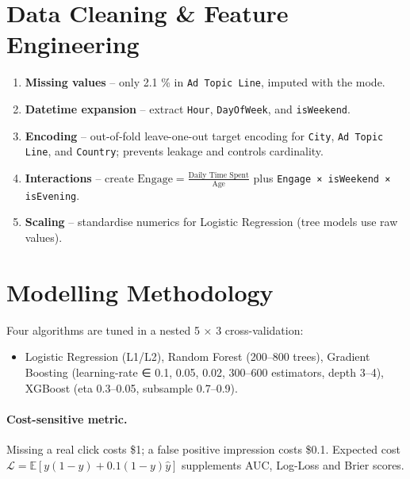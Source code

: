 \documentclass[12pt,a4paper]{article}
\begin{document}
\section{Data Cleaning \& Feature Engineering}\label{sec:fe}

\begin{enumerate}[leftmargin=2em]
  \item \textbf{Missing values} – only 2.1 \% in \texttt{Ad Topic Line},
        imputed with the mode.
  \item \textbf{Datetime expansion} – extract \texttt{Hour},
        \texttt{DayOfWeek}, and \texttt{isWeekend}.
  \item \textbf{Encoding} – out-of-fold leave-one-out target encoding
        for \texttt{City}, \texttt{Ad Topic Line}, and \texttt{Country};
        prevents leakage and controls cardinality.
  \item \textbf{Interactions} – create
        \(\text{Engage}= \frac{\text{Daily Time Spent}}{\text{Age}}\)
        plus \texttt{Engage × isWeekend × isEvening}.
  \item \textbf{Scaling} – standardise numerics for Logistic Regression
        (tree models use raw values).
\end{enumerate}

\section{Modelling Methodology}\label{sec:models}

Four algorithms are tuned in a nested 5 × 3 cross-validation:

\begin{itemize}[leftmargin=2em]
  \item Logistic Regression (L1/L2),  
        Random Forest (200–800 trees),  
        Gradient Boosting (learning-rate ∈ {0.1, 0.05, 0.02},
        300–600 estimators, depth 3–4),  
        XGBoost (eta 0.3–0.05, subsample 0.7–0.9).
\end{itemize}

\paragraph{Cost-sensitive metric.}
Missing a real click costs \$1; a false positive impression costs \$0.1.
Expected cost  
\(\mathcal{L} = \mathbb{E}[ y(1-\hat y) + 0.1(1-y)\hat y ]\)
supplements AUC, Log-Loss and Brier scores.
\end{document}
